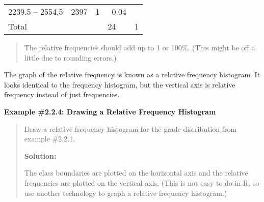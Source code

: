 \documentclass[]{book}
\begin{document}
\begin{longtable}[]{@{}lllll@{}}
\begin{minipage}[t]{0.23\columnwidth}
2239.5 -- 2554.5\strut
\end{minipage} & \begin{minipage}[t]{0.13\columnwidth}\raggedright
2397\strut
\end{minipage} & \begin{minipage}[t]{0.14\columnwidth}\raggedright
1\strut
\end{minipage} & \begin{minipage}[t]{0.14\columnwidth}\raggedright
~0.04\strut
\end{minipage}\tabularnewline
\begin{minipage}[t]{0.18\columnwidth}\raggedright
Total\strut
\end{minipage} & \begin{minipage}[t]{0.23\columnwidth}\raggedright
\strut
\end{minipage} & \begin{minipage}[t]{0.13\columnwidth}\raggedright
\strut
\end{minipage} & \begin{minipage}[t]{0.14\columnwidth}\raggedright
24\strut
\end{minipage} & \begin{minipage}[t]{0.14\columnwidth}\raggedright
1\strut
\end{minipage}\tabularnewline
\bottomrule
\end{longtable}

\begin{quote}
The relative frequencies should add up to 1 or 100\%. (This might be
off a little due to rounding errors.)
\end{quote}

The graph of the relative frequency is known as a relative frequency
histogram. It looks identical to the frequency histogram, but the
vertical axis is relative frequency instead of just frequencies.

\textbf{Example \#2.2.4: Drawing a Relative Frequency Histogram}

\begin{quote}
Draw a relative frequency histogram for the grade distribution from
example \#2.2.1.

\textbf{Solution:}

The class boundaries are plotted on the horizontal axis and the
relative frequencies are plotted on the vertical axis. (This is not
easy to do in R, so use another technology to graph a relative
frequency histogram.)
\end{quote}
\end{document}
